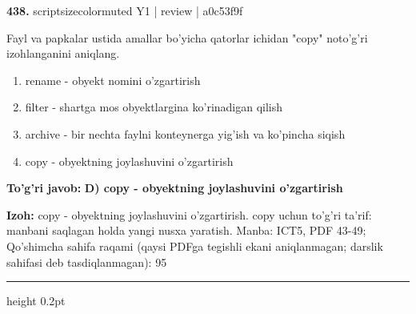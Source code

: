 \documentclass[10pt,a4paper]{article}
\begin{document}
{\bfseries\sffamily\color{ink} 438.} {scriptsizecolor{muted} Y1 | review | a0c53f9f}
\par
Fayl va papkalar ustida amallar bo'yicha qatorlar ichidan "copy" noto'g'ri izohlanganini aniqlang.
\begin{enumerate}[label=\Alph*),leftmargin=9mm]
\item rename - obyekt nomini o'zgartirish
\item filter - shartga mos obyektlargina ko'rinadigan qilish
\item archive - bir nechta faylni konteynerga yig'ish va ko'pincha siqish
\item copy - obyektning joylashuvini o'zgartirish
\end{enumerate}
\begin{tcolorbox}[enhanced,breakable,colback=teal!4,colframe=teal!60!black,boxrule=0.45pt,arc=1.2mm,left=2.7mm,right=2.7mm,top=1.8mm,bottom=1.8mm,before skip=2mm,after skip=2mm]
{\bfseries\sffamily\color{teal}To'g'ri javob:} \textbf{D) copy - obyektning joylashuvini o'zgartirish}
\par\smallskip
{\bfseries Izoh:} copy - obyektning joylashuvini o'zgartirish. copy uchun to'g'ri ta'rif: manbani saqlagan holda yangi nusxa yaratish. Manba: ICT5, PDF 43-49; Qo'shimcha sahifa raqami (qaysi PDFga tegishli ekani aniqlanmagan; darslik sahifasi deb tasdiqlanmagan): 95
\end{tcolorbox}
\vspace{2mm}\hrule height 0.2pt\vspace{3mm}
\end{document}
